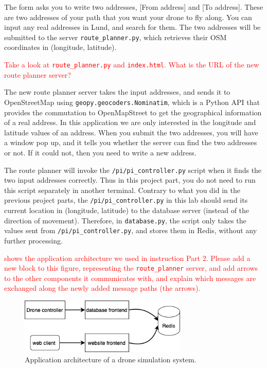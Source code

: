 \documentclass{article}
\begin{document}
The form asks you to write two addresses, [From address] and [To address]. These are two addresses of your path that you want your drone to fly along. You can input any real addresses in Lund, and search for them. The two addresses will be submitted to the server \verb!route_planner.py!, which retrieves their OSM coordinates in (longitude, latitude).

\vspace{0.5cm}
\parbox[t]{13cm}{\textcolor{red}{Take a look at \texttt{route\_planner.py} and \texttt{index.html}. What is the URL of the new route planner server?}} \vspace{0.5cm}

The new route planner server takes the input addresses, and sends it to OpenStreetMap using \verb!geopy.geocoders.Nominatim!, which is a Python API that provides the commutation to OpenMapStreet to get the geographical information of a real address. In this application we are only interested in the longitude and latitude values of an address. When you submit the two addresses, you will have a window pop up, and it tells you whether the server can find the two addresses or not. If it could not, then you need to write a new address.

The route planner will invoke the \verb!/pi/pi_controller.py! script when it finds the two input addresses correctly.
Thus in this project part, you do not need to run this script separately in another terminal. Contrary to what you did in the previous project parts, the \verb!/pi/pi_controller.py! in this lab should send its current location in (longitude, latitude) to the database server (instead of the direction of movement). Therefore, in \verb!database.py!, the script only takes the values sent from \verb!/pi/pi_controller.py!, and stores them in Redis, without any further processing.

\vspace{0.5cm}
\parbox[t]{13cm}{\textcolor{red}{ shows the application architecture we used in instruction Part 2. Please add a new block to this figure, representing the \texttt{route\_planner} server, and add arrows to the other components it communicates with, and explain which messages are exchanged along the newly added message paths (the arrows). } } \vspace{0.5cm}

\begin{figure}[h!]
    \centering
    \includegraphics[width=80mm]{drone-system-architecture.drawio.png}
    \caption{Application architecture of a drone simulation system.}
    \label{fig:drone}
\end{figure}
\end{document}
